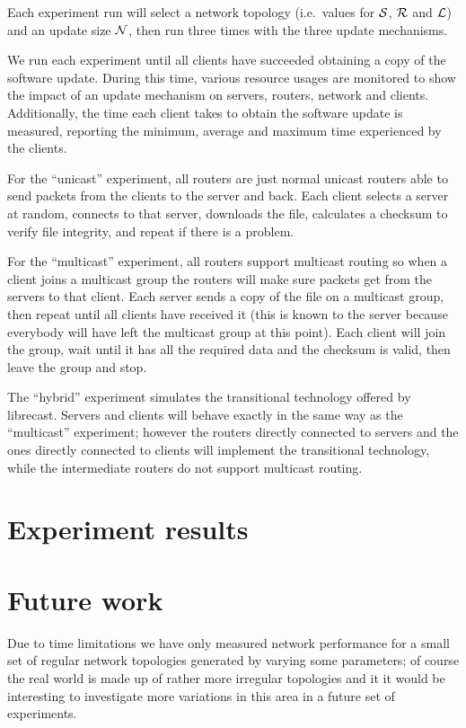 \documentclass[a4paper,12pt]{article}
\begin{document}
Each experiment run will select a network topology (i.e.\ values
for ${\cal S}$, ${\cal R}$ and ${\cal L}$) and an update size
${\cal N}$, then run three times with the three update mechanisms.

We run each experiment until all clients have succeeded obtaining
a copy of the software update. During this time, various resource
usages are monitored to show the impact of an update mechanism on
servers, routers, network and clients. Additionally, the time
each client takes to obtain the software update is measured, reporting
the minimum, average and maximum time experienced by the clients.

For the ``unicast'' experiment, all routers are just normal
unicast routers able to send packets from the clients to
the server and back.  Each client selects a server at random,
connects to that server, downloads the file, calculates a
checksum to verify file integrity, and repeat if there
is a problem.

For the ``multicast'' experiment, all routers support
multicast routing so when a client joins a multicast group
the routers will make sure packets get from the servers to
that client.  Each server sends a copy of the file on a
multicast group, then repeat until all clients have received
it (this is known to the server because everybody will have
left the multicast group at this point).  Each client will
join the group, wait until it has all the required data and
the checksum is valid, then leave the group and stop.

The ``hybrid'' experiment simulates the transitional technology
offered by librecast. Servers and clients will behave exactly
in the same way as the ``multicast'' experiment; however the
routers directly connected to servers and the ones directly
connected to clients will implement the transitional technology,
while the intermediate routers do not support multicast routing.

\section{Experiment results}
\label{results}

\section{Future work}
\label{future}

Due to time limitations we have only measured network performance
for a small set of regular network topologies generated by varying
some parameters; of course the real world is made up of rather
more irregular topologies and it it would be interesting to investigate
more variations in this area in a future set of experiments.
\end{document}
